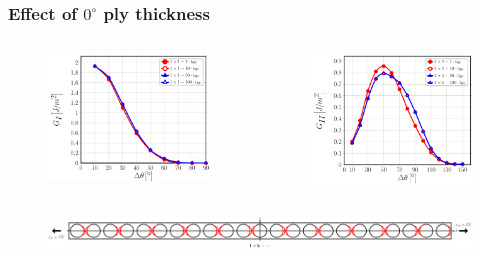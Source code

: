 \documentclass[first,firstsupp,lastsupp,last,hyperref,table]{ETHclass}
\begin{document}
\begin{frame}
\frametitle{\vspace{0.2cm}\small Effect of $0^{\circ}$ ply thickness}
\vspace{-.75cm}
\centering
\begin{columns}[c]
\centering
\begin{column}{0.5\textwidth}
\centering
\begin{figure}
\centering
\includegraphics[width=\columnwidth]{1x1-i-vf60-GI-zero.pdf}
\end{figure}
\end{column}
\begin{column}{0.5\textwidth}
\centering
\begin{figure}
\centering
\includegraphics[width=\columnwidth]{1x1-i-vf60-GII-zero.pdf}
\end{figure}
\end{column}
\end{columns}
\begin{figure}
\centering
\includegraphics[width=\textwidth]{onefiber-sameside-crackshielding1.pdf}
\end{figure}
\end{frame}
\end{document}

